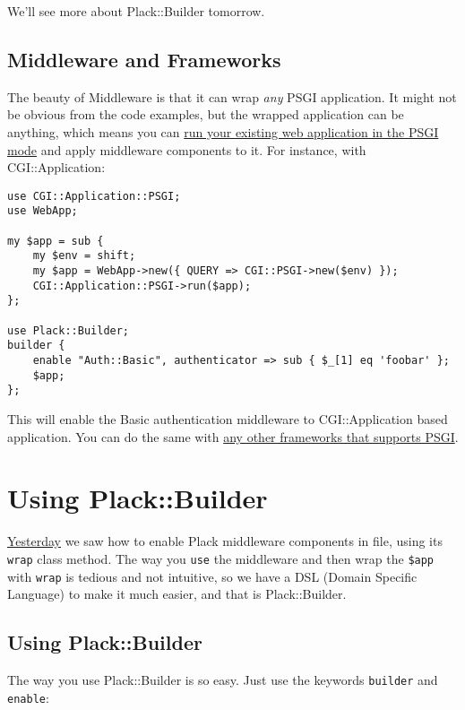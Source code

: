 We'll see more about Plack::Builder tomorrow.

\section{Middleware and Frameworks}\label{middleware-and-frameworks}

The beauty of Middleware is that it can wrap \emph{any} PSGI
application. It might not be obvious from the code examples, but the
wrapped application can be anything, which means you can
\href{http://advent.plackperl.org/2009/12/day-7-use-web-application-framework-in-psgi.html}{run
your existing web application in the PSGI mode} and apply middleware
components to it. For instance, with CGI::Application:

\begin{lstlisting}
use CGI::Application::PSGI;
use WebApp;

my $app = sub {
    my $env = shift;
    my $app = WebApp->new({ QUERY => CGI::PSGI->new($env) });
    CGI::Application::PSGI->run($app);
};

use Plack::Builder;
builder {
    enable "Auth::Basic", authenticator => sub { $_[1] eq 'foobar' };
    $app;
};
\end{lstlisting}

This will enable the Basic authentication middleware to CGI::Application
based application. You can do the same with
\href{http://plackperl.org/\#frameworks}{any other frameworks that
supports PSGI}.

\chapter{Using Plack::Builder}\label{day-11-using-plackbuilder}

\href{http://advent.plackperl.org/2009/12/day-10-using-plack-middleware.html}{Yesterday}
we saw how to enable Plack middleware components in  file, using
its \lstinline!wrap! class method. The way you \lstinline!use! the
middleware and then wrap the \lstinline!$app! with \lstinline!wrap! is
tedious and not intuitive, so we have a DSL (Domain Specific Language)
to make it much easier, and that is Plack::Builder.

\section{Using Plack::Builder}\label{using-plackbuilder}

The way you use Plack::Builder is so easy. Just use the keywords
\lstinline!builder! and \lstinline!enable!:


